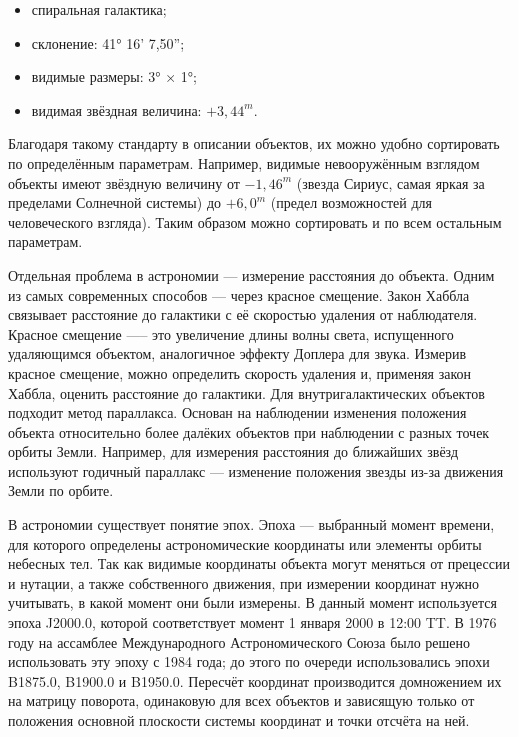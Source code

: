 \documentclass[14pt]{extreport}
\begin{document}
{\begin{itemize}
            \item спиральная галактика;
            
            \item склонение: 41° 16' 7,50'';
            
            \item видимые размеры: 3° × 1°;
            
            \item видимая звёздная величина: $+3,44^m$.
        \end{itemize}

        Благодаря такому стандарту в описании объектов, их можно удобно сортировать по определённым параметрам. Например, видимые невооружённым взглядом объекты имеют звёздную величину от $-1,46^m$ (звезда Сириус, самая яркая за пределами Солнечной системы) до $+6,0^m$ (предел возможностей для человеческого взгляда). Таким образом можно сортировать и по всем остальным параметрам.

        Отдельная проблема в астрономии --- измерение расстояния до объекта. Одним из самых современных способов --- через красное смещение. Закон Хаббла связывает расстояние до галактики с её скоростью удаления от наблюдателя. Красное смещение —-- это увеличение длины волны света, испущенного удаляющимся объектом, аналогичное эффекту Доплера для звука. Измерив красное смещение, можно определить скорость удаления и, применяя закон Хаббла, оценить расстояние до галактики. Для внутригалактических объектов подходит метод параллакса. Основан на наблюдении изменения положения объекта относительно более далёких объектов при наблюдении с разных точек орбиты Земли. Например, для измерения расстояния до ближайших звёзд используют годичный параллакс — изменение положения звезды из-за движения Земли по орбите. 

        В астрономии существует понятие эпох. Эпоха --- выбранный момент времени, для которого определены астрономические координаты или элементы орбиты небесных тел. Так как видимые координаты объекта могут меняться от прецессии и нутации, а также собственного движения, при измерении координат нужно учитывать, в какой момент они были измерены. В данный момент используется эпоха J2000.0, которой соответствует момент 1 января 2000 в 12:00 TT. В 1976 году на ассамблее Международного Астрономического Союза было решено использовать эту эпоху с 1984 года; до этого по очереди использовались эпохи B1875.0, B1900.0 и B1950.0. Пересчёт координат производится домножением их на матрицу поворота, одинаковую для всех объектов и зависящую только от положения основной плоскости системы координат и точки отсчёта на ней.
        
}
\end{document}
